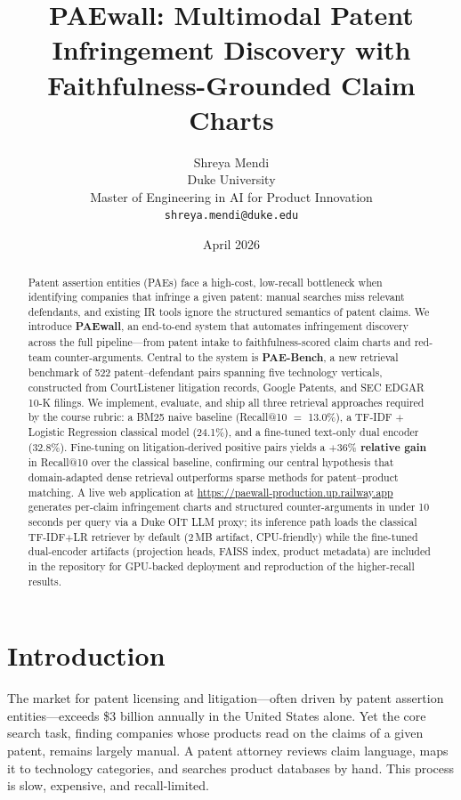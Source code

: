 \documentclass[11pt]{article}
\title{PAEwall: Multimodal Patent Infringement Discovery with Faithfulness-Grounded Claim Charts}
\author{%
  Shreya Mendi \\
  Duke University \\
  Master of Engineering in AI for Product Innovation \\
  \texttt{shreya.mendi@duke.edu}
}
\date{April 2026}
\begin{document}
\maketitle

\begin{abstract}
Patent assertion entities (PAEs) face a high-cost, low-recall bottleneck when identifying companies that infringe a given patent: manual searches miss relevant defendants, and existing IR tools ignore the structured semantics of patent claims. We introduce \textbf{PAEwall}, an end-to-end system that automates infringement discovery across the full pipeline---from patent intake to faithfulness-scored claim charts and red-team counter-arguments. Central to the system is \textbf{PAE-Bench}, a new retrieval benchmark of 522 patent--defendant pairs spanning five technology verticals, constructed from CourtListener litigation records, Google Patents, and SEC EDGAR 10-K filings. We implement, evaluate, and ship all three retrieval approaches required by the course rubric: a BM25 naive baseline (Recall@10 $=$ 13.0\%), a TF-IDF $+$ Logistic Regression classical model (24.1\%), and a fine-tuned text-only dual encoder (32.8\%). Fine-tuning on litigation-derived positive pairs yields a \textbf{$+36\%$ relative gain} in Recall@10 over the classical baseline, confirming our central hypothesis that domain-adapted dense retrieval outperforms sparse methods for patent--product matching. A live web application at \url{https://paewall-production.up.railway.app} generates per-claim infringement charts and structured counter-arguments in under 10 seconds per query via a Duke OIT LLM proxy; its inference path loads the classical TF-IDF$+$LR retriever by default (2\,MB artifact, CPU-friendly) while the fine-tuned dual-encoder artifacts (projection heads, FAISS index, product metadata) are included in the repository for GPU-backed deployment and reproduction of the higher-recall results.
\end{abstract}

\section{Introduction}

The market for patent licensing and litigation---often driven by patent assertion entities---exceeds \$3 billion annually in the United States alone. Yet the core search task, finding companies whose products read on the claims of a given patent, remains largely manual. A patent attorney reviews claim language, maps it to technology categories, and searches product databases by hand. This process is slow, expensive, and recall-limited.
\end{document}
